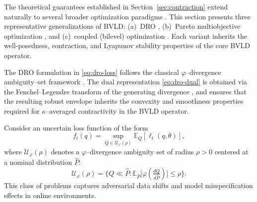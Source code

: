 \documentclass[11pt]{article}
\theoremstyle{plain}
\theoremstyle{definition}
\theoremstyle{remark}
\begin{document}
The theoretical guarantees established in Section~\ref{sec:contraction} 
extend naturally to several broader optimization paradigms 
\cite{BenTal2009,Shapiro2021,Bauschke2017,Combettes2021,GaoKleywegt2023,ZhangDempe2023}.  
This section presents three representative generalizations of BVLD: 
(a)~DRO
\cite{Namkoong2016,Hu2013,BlanchetMurthy2019,EsfahaniKuhn2018,Feng2021,GaoKleywegt2023}, 
(b)~Pareto multiobjective optimization 
\cite{Miettinen1999,Ehrgott2005,Bonilla2018,Fliege2021}, and 
(c)~coupled (bilevel) optimization 
\cite{Colson2007,Sinha2017,Dempe2020,ZhangDempe2023}.  
Each variant inherits the well-posedness, contraction, and Lyapunov 
stability properties of the core BVLD operator.



The DRO formulation in \eqref{eq:dro-loss} follows the classical
$\varphi$–divergence ambiguity–set framework
\cite{BenTal2009,Shapiro2021,Duchi2021}.
The dual representation \eqref{eq:dro-dual} is obtained via the
Fenchel–Legendre transform of the generating divergence
\cite{Namkoong2016,Hu2013,BlanchetMurthy2019,EsfahaniKuhn2018,Feng2021},
and ensures that the resulting robust envelope inherits the
convexity and smoothness properties required for $\kappa$–averaged
contractivity in the BVLD operator.


Consider an uncertain loss function of the form
\begin{equation}
f_t(q)
=\sup_{Q\in\mathcal U_\varphi(\rho)} 
\mathbb E_Q[\ell_t(q,\theta)],
\label{eq:dro-loss}
\end{equation}
where $\mathcal U_\varphi(\rho)$ denotes a $\varphi$–divergence ambiguity set 
of radius $\rho>0$ centered at a nominal distribution $\hat P$:
\[
\mathcal U_\varphi(\rho)
=\Big\{
Q\!\ll\!\hat P:
\mathbb E_{\hat P}\big[\varphi(\tfrac{dQ}{d\hat P})\big]\le\rho
\Big\}.
\]
This class of problems captures adversarial data shifts and model 
misspecification effects in online environments.
\end{document}
